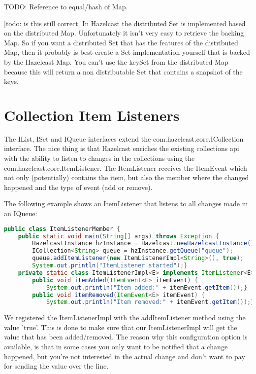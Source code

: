 TODO: Reference to equal/hash of Map.

[todo: is this still correct]
In Hazelcast the distributed Set is implemented based on the distributed Map. Unfortunately it isn't very easy to retrieve the backing Map. So if you want a distributed Set that has the features of the distributed Map, then it probably is best create a Set implementation yourself that is backed by the Hazelcast Map. You can't use the keySet from the distributed Map because this will return a non distributable Set that contains a snapshot of the keys.

\section{Collection Item Listeners}
The IList, ISet and IQueue interfaces extend the com.hazelcast.core.ICollection interface. The nice thing is that Hazelcast enriches the existing collections api with the ability to listen to changes in the collections using the com.hazelcast.core.ItemListener. The ItemListener receives the ItemEvent which not only (potentially) contains the item, but also the member where the changed happened and the type of event (add or remove).

The following example shows an ItemListener that listens to all changes made in an IQueue:
\begin{lstlisting}[language=java]
public class ItemListenerMember {
    public static void main(String[] args) throws Exception {
        HazelcastInstance hzInstance = Hazelcast.newHazelcastInstance();
        ICollection<String> queue = hzInstance.getQueue("queue");
        queue.addItemListener(new ItemListenerImpl<String>(), true);
        System.out.println("ItemListener started");}
    private static class ItemListenerImpl<E> implements ItemListener<E> {
        public void itemAdded(ItemEvent<E> itemEvent) {
            System.out.println("Item added:" + itemEvent.getItem());}
        public void itemRemoved(ItemEvent<E> itemEvent) {
            System.out.println("Item removed:" + itemEvent.getItem());}}}
\end{lstlisting}
We registered the ItemListenerImpl with the addItemListener method using the value 'true'. This is done to make sure that our ItemListenerImpl will get the value that has been added/removed. The reason why this configuration option is available, is that in some cases you only want to be notified that a change happened, but you're not interested in the actual change and don't want to pay for sending the value over the line.

